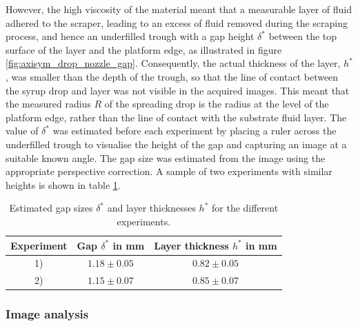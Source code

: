 \documentclass[aip,graphicx]{revtex4-1}
\begin{document}
However, the high viscosity of the material meant that a measurable layer of fluid adhered to the scraper, leading to an excess of fluid removed during the scraping process, and hence an underfilled trough with a gap height $\delta^*$ between the top surface of the layer and the platform edge, as illustrated in figure \ref{fig:axisym_drop_nozzle_gap}. Consequently, the actual thickness of the layer, $h^*$, was smaller than the depth of the trough, so that the line of contact between the syrup drop and layer was not visible in the acquired images. This meant that the measured radius $R$ of the spreading drop is the radius at the level of the platform edge, rather than the line of contact with the substrate fluid layer. The value of $\delta^*$ was estimated before each experiment by placing a ruler across the underfilled trough to visualise the height of the gap and capturing an image at a suitable known angle.
The gap size was estimated from the image using the appropriate perspective correction. A sample of two experiments with similar heights is shown in table \ref{tab:gap_sizes}.
 
{\renewcommand{\arraystretch}{1.2}
 \begin{table}[!ht]
 \begin{center}
 \begin{tabular}{c | c | c}
  Experiment & Gap $\delta^*$ in mm & Layer thickness $h^*$ in mm \\ 
   \hline
   1) & $1.18 \pm 0.05$ & $0.82 \pm 0.05$ \\
   2) & $1.15 \pm 0.07$ & $0.85 \pm 0.07$
 \end{tabular}
 \caption{Estimated gap sizes $\delta^*$ and layer thicknesses $h^*$ for the different experiments.}
 \label{tab:gap_sizes}
 \end{center}
 \end{table}}
 

\subsubsection{Image analysis}
\label{image}
\end{document}
